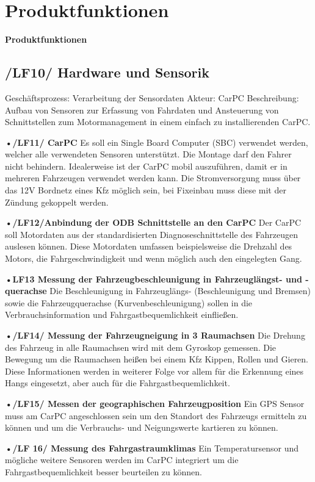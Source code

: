 \chapter{Produktfunktionen}

\textbf{Produktfunktionen}
\section{/LF10/ Hardware und Sensorik}
Geschäftsprozess:	Verarbeitung der Sensordaten
Akteur:			CarPC
Beschreibung:	Aufbau von Sensoren zur Erfassung von Fahrdaten und Ansteuerung von Schnittstellen zum Motormanagement in einem einfach zu installierenden CarPC.

\textbf{•/LF11/ CarPC}
Es soll ein Single Board Computer (SBC) verwendet werden, welcher alle verwendeten Sensoren unterstützt. Die Montage darf den Fahrer nicht behindern. Idealerweise ist der CarPC mobil auszuführen, damit er in mehreren Fahrzeugen verwendet werden kann. Die Stromversorgung muss über das 12V Bordnetz eines Kfz möglich sein, bei Fixeinbau muss diese mit der Zündung gekoppelt werden.

\textbf{•/LF12/Anbindung der ODB Schnittstelle an den CarPC}
Der CarPC soll Motordaten aus der standardisierten Diagnoseschnittstelle des Fahrzeugen auslesen können. Diese Motordaten umfassen beispielsweise die Drehzahl des Motors, die Fahrgeschwindigkeit und wenn möglich auch den eingelegten Gang.

\textbf{•LF13 Messung der Fahrzeugbeschleunigung in Fahrzeuglängst- und -querachse}
Die Beschleunigung in Fahrzeuglängs- (Beschleunigung und Bremsen) sowie die Fahrzeugquerachse (Kurvenbeschleunigung) sollen in die Verbrauchsinformation und Fahrgastbequemlichkeit einfließen.

\textbf{•/LF14/ Messung der Fahrzeugneigung in 3 Raumachsen}
Die Drehung des Fahrzeug in alle Raumachsen wird mit dem Gyroskop gemessen. Die Bewegung um die Raumachsen heißen bei einem Kfz Kippen, Rollen und Gieren. Diese Informationen werden in weiterer Folge vor allem für die Erkennung eines Hangs eingesetzt, aber auch für die Fahrgastbequemlichkeit.

\textbf{•/LF15/ Messen der geographischen Fahrzeugposition}
Ein GPS Sensor muss am CarPC angeschlossen sein um den Standort des Fahrzeugs ermitteln zu können und um die Verbrauchs- und Neigungswerte kartieren zu können.

\textbf{•/LF 16/ Messung des Fahrgastraumklimas}
Ein Temperatursensor und mögliche weitere Sensoren werden im CarPC integriert um die Fahrgastbequemlichkeit besser beurteilen zu können.

